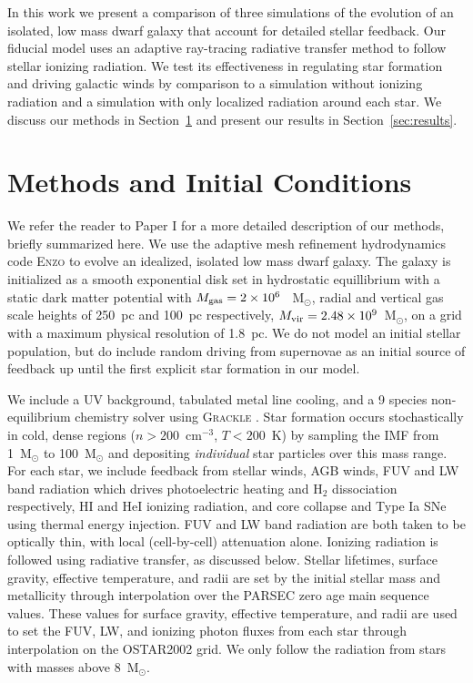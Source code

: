 \documentclass[twocolumn]{aastex62}
\begin{document}
In this work we present a comparison of three simulations of the evolution of an isolated, low mass dwarf galaxy that account for detailed stellar feedback. Our fiducial model uses an adaptive ray-tracing radiative transfer method to follow stellar ionizing radiation. We test its effectiveness in regulating star formation and driving galactic winds by comparison to a simulation without ionizing radiation and a simulation with only localized radiation around each star. We discuss our methods in Section~\ref{sec:methods} and present our results in Section~\ref{sec:results}.

\section{Methods and Initial Conditions} \label{sec:methods}
We refer the reader to Paper I for a more detailed description of our methods, briefly summarized here. We use the adaptive mesh refinement hydrodynamics code \textsc{Enzo} \citep{Enzo2014} to evolve an idealized, isolated low mass dwarf galaxy. The galaxy is initialized as a smooth exponential disk set in hydrostatic equillibrium with a static dark matter potential \citep{Burkert1995} with $M_{\rm gas} = 2 \times 10^6~$~M$_{\odot}$, radial and vertical gas scale heights of 250~pc and 100~pc respectively, $M_{\rm vir} = 2.48 \times 10^9$~M$_{\odot}$, on a grid with a maximum physical resolution of 1.8~pc. We do not model an initial stellar population, but do include random driving from supernovae as an initial source of feedback up until the first explicit star formation in our model.

We include a UV background, tabulated metal line cooling, and a 9 species non-equilibrium chemistry solver using \textsc{Grackle} \citep{GrackleMethod}. Star formation occurs stochastically in cold, dense regions ($n > 200$~cm$^{-3}$, $T < 200$~K) by sampling the \cite{Salpeter1955} IMF from 1~M$_{\odot}$ to 100~M$_{\odot}$ and depositing \textit{individual} star particles over this mass range. For each star, we include feedback from stellar winds, AGB winds, FUV and LW band radiation which drives photoelectric heating and H$_2$ dissociation respectively, HI and HeI ionizing radiation, and core collapse and Type Ia SNe using thermal energy injection. FUV and LW band radiation are both taken to be optically thin, with local (cell-by-cell) attenuation alone. Ionizing radiation is followed using radiative transfer, as discussed below. Stellar lifetimes, surface gravity, effective temperature, and radii are set by the initial stellar mass and metallicity through interpolation over the PARSEC \citep{Bressan2012} zero age main sequence values. These values for surface gravity, effective temperature, and radii are used to set the FUV, LW, and ionizing photon fluxes from each star through interpolation on the OSTAR2002 \citep{LanzHubeny2003} grid. We only follow the radiation from stars with masses above 8~M$_{\odot}$. 
\end{document}
